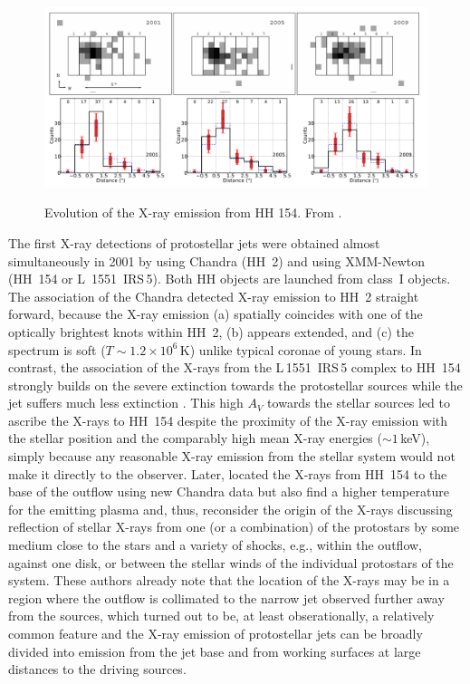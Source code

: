 \begin{figure}[t]
\centering

\includegraphics[height=6cm]{figs/hh154}
\caption{Evolution of the X-ray emission from HH 154. From \citet{Schneider_2011}. \label{fig:hh154}}
\end{figure}


The first X-ray detections of protostellar jets were obtained almost simultaneously in 2001 by \citet{Pravdo_2001} using Chandra (HH~2) and \citet{Favata_2002}
using XMM-Newton (HH~154 or L~1551~IRS\,5). Both HH objects are launched from class~I objects. The association of the Chandra detected X-ray emission to HH~2 straight forward, because the X-ray emission  (a) spatially coincides with one of the optically brightest knots within HH~2, (b) appears extended, and (c) the spectrum is soft ($T\sim1.2\times10^6\,$K) unlike typical coronae of young stars. In contrast, the association of the X-rays from the L\,1551~IRS\,5 complex to HH~154 strongly builds on the severe extinction towards the protostellar sources while the jet suffers much less extinction \citep[$A_V(jet)\sim10\,$mag vs $A_V(protostars)\gtrsim150$\,mag, e.g.,][]{White_2000,Fridlund_2005}. This high $A_V$ towards the stellar sources led \citet{Favata_2002} to ascribe the X-rays to HH~154 despite the proximity of the X-ray emission with the stellar position and the comparably high mean X-ray energies ($\sim1\,$keV), simply because any reasonable X-ray emission from the stellar system would not make it directly to the observer. Later, \citet{Bally_2003} located the X-rays from HH~154 to the base of the outflow using new Chandra data but also find a higher temperature for the emitting plasma and, thus, reconsider the origin of the X-rays discussing reflection of stellar X-rays from one (or a combination) of the protostars by some medium close to the stars and a variety of shocks, e.g., within the outflow, against one disk, or between the stellar winds of the individual protostars of the system. These authors already note that the location of the X-rays may be in a region where the outflow is collimated to the narrow jet observed further away from the sources, which turned out to be, at least obserationally, a relatively common feature and the X-ray emission of protostellar jets can be broadly divided into emission from the jet base and from working surfaces at large distances to the driving sources.

